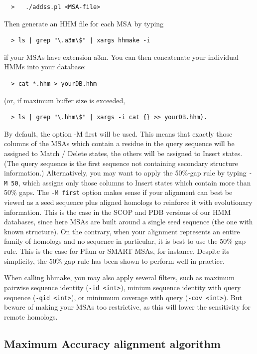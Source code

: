 \documentclass[11pt,a4paper]{article}
\begin{document}
\begin{verbatim}
  >   ./addss.pl <MSA-file>
\end{verbatim}

Then generate an HHM file for each MSA by typing
\begin{verbatim}
  > ls | grep "\.a3m\$" | xargs hhmake -i 
\end{verbatim}

if your MSAs have extension a3m. You can then concatenate your individual HMMs
into your database:
\begin{verbatim}
  > cat *.hhm > yourDB.hhm
\end{verbatim}
(or, if maximum buffer size is exceeded, 
\begin{verbatim}
  > ls | grep "\.hhm\$" | xargs -i cat {} >> yourDB.hhm).
\end{verbatim}

By default, the option -M first will be used. This means that exactly those columns of 
the MSAs which contain a residue in the query sequence will be assigned to Match 
/ Delete states, the others will be assigned to Insert states. (The query sequence is 
the first sequence not containing secondary structure information.) Alternatively, you 
may want to apply the 50\%-gap rule by typing \verb`-M 50`, which assigns only those columns 
to Insert states which contain more than 50\% gaps. The \verb`-M first` option makes sense 
if your alignment can best be viewed as a seed sequence plus aligned homologs to 
reinforce it with evolutionary information. This is the case in the SCOP and PDB 
versions of our HMM databases, since here MSAs are built around a single seed 
sequence (the one with known structure). On the contrary, when your alignment 
represents an entire family of homologs and no sequence in particular, it is best to 
use the 50\% gap rule. This is the case for Pfam or SMART MSAs, for instance. 
Despite its simplicity, the 50\% gap rule has been shown to perform well in practice.

When calling hhmake, you may also apply several filters, such as maximum pairwise 
sequence identity (\verb`-id <int>`), minium sequence identity with query sequence 
(\verb`-qid <int>`), or miniumum coverage with query (\verb`-cov <int>`). But beware 
of making your MSAs too restrictive, as this will lower the sensitivity for remote homologs.


\subsection{Maximum Accuracy alignment algorithm}
\end{document}
